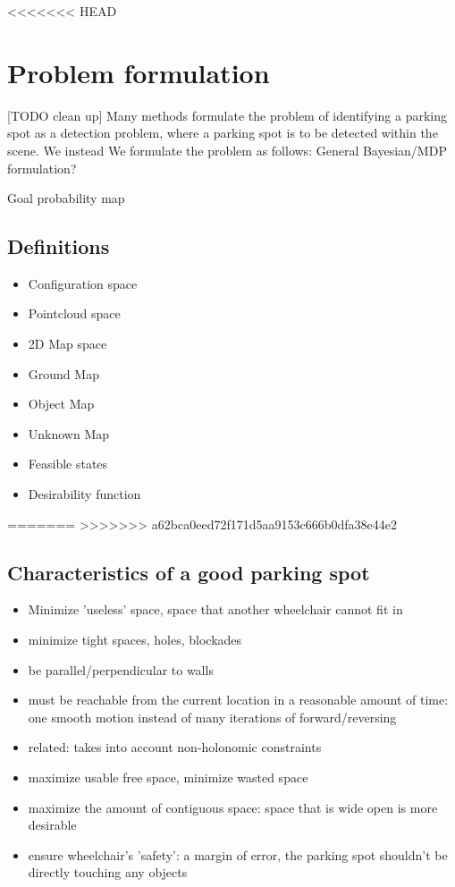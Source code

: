 <<<<<<< HEAD

\section{Problem formulation}

[TODO clean up]
Many methods formulate the problem of identifying a parking spot
as a detection problem, where a parking spot is to be detected within the scene.
We instead 
We formulate the problem as follows: General Bayesian/MDP formulation?

Goal probability map

\subsection{Definitions}

\begin{itemize}
\item Configuration space
\item Pointcloud space
\item 2D Map space
\item Ground Map
\item Object Map
\item Unknown Map
\item Feasible states
\item Desirability function
\end{itemize}

=======
>>>>>>> a62bca0eed72f171d5aa9153c666b0dfa38e44e2
\subsection{Characteristics of a good parking spot}
\begin{itemize}
\item Minimize 'useless' space, space that another wheelchair cannot fit in 
\item minimize tight spaces, holes, blockades
\item be parallel/perpendicular to walls
\item must be reachable from the current location in a reasonable amount of
time: one smooth motion instead of many iterations of forward/reversing
\item related: takes into account non-holonomic constraints
\item maximize usable free space, minimize wasted space
\item maximize the amount of contiguous space: space that is wide open is more
desirable
\item ensure wheelchair's 'safety': a margin of error, the parking spot
shouldn't be directly touching any objects
\end{itemize}

